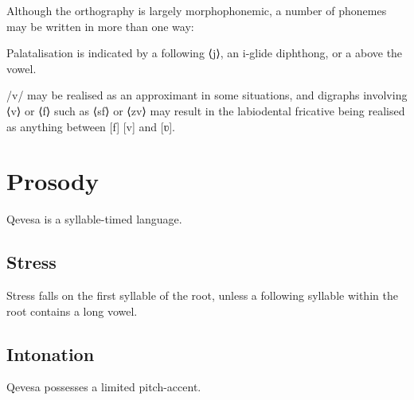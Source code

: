 \documentclass[grammar]{subfiles}
\begin{document}
  Although the orthography is largely morphophonemic, a number of phonemes may be written in more than one way:

  \begin{itemize*}
    \item Palatalisation is indicated by a following ⟨j⟩, an i-glide diphthong, or a  above the vowel.  %
    \item /v/ may be realised as an approximant in some situations, and digraphs involving ⟨v⟩ or ⟨f⟩ such as ⟨sf⟩ or ⟨zv⟩ may result in the labiodental fricative being realised as anything between [f] [v] and [ʋ].
  \end{itemize*}

  \section{Prosody}
  \label{sec:prosody}

  Qevesa is a syllable-timed language.
  \ToBeWritten

  \subsection{Stress}
  \label{ssec:stress}

  Stress falls on the first syllable of the root, unless a following syllable within the root contains a long vowel.  \ToBeWritten

  \subsection{Intonation}
  \label{ssec:intonation}

  Qevesa possesses a limited pitch-accent.
  \ToBeWritten
\end{document}
